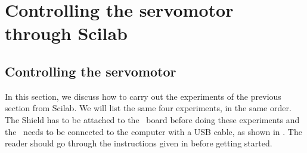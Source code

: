 \section{Controlling the servomotor through Scilab}
\subsection{Controlling the servomotor}
\label{sec:servo-sci}
In this section, we discuss how to carry out the experiments of the
previous section from Scilab. We will list the same four experiments,
in the same order.  The Shield has to be attached to the \arduino\ board
before doing these experiments and the \arduino\ needs to be connected to the computer 
with a USB cable, as shown in .
The reader should go through the instructions given in
 before getting started. 

